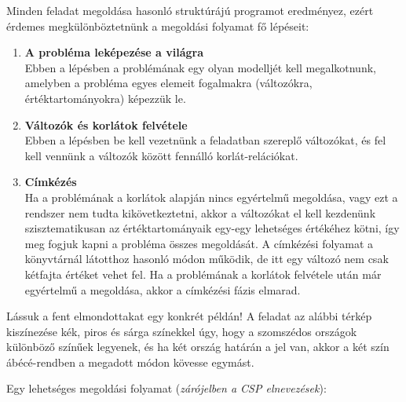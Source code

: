 Minden \clpfd feladat megoldása hasonló struktúrájú programot eredményez,
ezért érdemes megkülönböztetnünk a megoldási folyamat fő lépéseit:

\begin{enumerate}
\item {\bf A probléma leképezése a \clpfd világra} \\
    Ebben a lépésben a problémának egy olyan modelljét kell megalkotnunk,
    amelyben a probléma egyes elemeit \clpfd fogalmakra (változókra,
    értéktartományokra) képezzük le.

\item {\bf Változók és korlátok felvétele} \\
    Ebben a lépésben be kell vezetnünk a feladatban szereplő változókat,
    és fel kell vennünk a változók között fennálló korlát-relációkat.

\item {\bf Címkézés} \\
    Ha a problémának a korlátok alapján nincs egyértelmű megoldása, vagy
    ezt a rendszer nem tudta kikövetkeztetni, akkor a változókat el kell
    kezdenünk szisztematikusan az értéktartományaik egy-egy lehetséges
    értékéhez kötni, így meg fogjuk kapni a probléma összes megoldását.
    A címkézési folyamat a \clpb könyvtárnál látotthoz hasonló módon
    működik, de itt egy változó nem csak kétfajta értéket vehet fel.
    Ha a problémának a korlátok felvétele után már egyértelmű a megoldása,
    akkor a címkézési fázis elmarad.
\end{enumerate}

Lássuk a fent elmondottakat egy konkrét példán! A feladat az alábbi térkép
kiszínezése kék, piros és sárga színekkel úgy, hogy a szomszédos országok
különböző színűek legyenek, és ha két ország határán a \cd{<} jel van, akkor
a két szín ábécé-rendben a megadott módon kövesse egymást.

\begin{center}\end{center}

Egy lehetséges megoldási folyamat (\emph{zárójelben a CSP elnevezések}):

